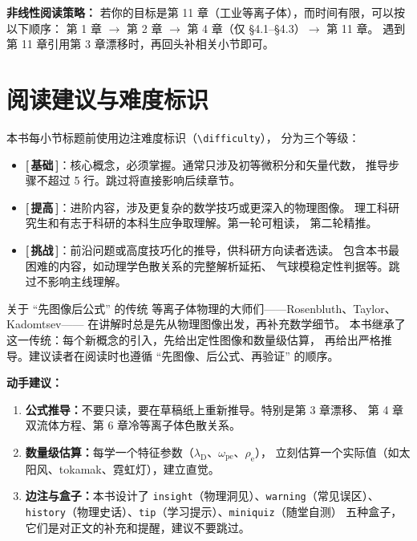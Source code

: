 \documentclass[12pt,a4paper,openany,oneside]{book}
\newcommand{\ee}{\mathrm{e}}
\begin{document}
\begin{tip}
\textbf{非线性阅读策略：}
若你的目标是第 11 章（工业等离子体），而时间有限，可以按以下顺序：
第 1 章 $\to$ 第 2 章 $\to$ 第 4 章（仅 \S 4.1--\S 4.3）$\to$ 第 11 章。
遇到第 11 章引用第 3 章漂移时，再回头补相关小节即可。
\end{tip}


\section*{阅读建议与难度标识}

本书每小节标题前使用边注难度标识（\texttt{\textbackslash difficulty}），
分为三个等级：

\begin{itemize}
\item \textbf{[\,基础\,]}：核心概念，必须掌握。通常只涉及初等微积分和矢量代数，
推导步骤不超过 5 行。跳过将直接影响后续章节。

\item \textbf{[\,提高\,]}：进阶内容，涉及更复杂的数学技巧或更深入的物理图像。
理工科研究生和有志于科研的本科生应争取理解。第一轮可粗读，
第二轮精推。

\item \textbf{[\,挑战\,]}：前沿问题或高度技巧化的推导，供科研方向读者选读。
包含本书最困难的内容，如动理学色散关系的完整解析延拓、
气球模稳定性判据等。跳过不影响主线理解。
\end{itemize}

\begin{history}{关于 ``先图像后公式'' 的传统}{}{}
等离子体物理的大师们——Rosenbluth、Taylor、Kadomtsev——
在讲解时总是先从物理图像出发，再补充数学细节。
本书继承了这一传统：每个新概念的引入，先给出定性图像和数量级估算，
再给出严格推导。建议读者在阅读时也遵循 ``先图像、后公式、再验证'' 的顺序。
\end{history}

\textbf{动手建议：}
\begin{enumerate}
\item \textbf{公式推导：}不要只读，要在草稿纸上重新推导。特别是第 3 章漂移、
第 4 章双流体方程、第 6 章冷等离子体色散关系。
\item \textbf{数量级估算：}每学一个特征参数（$\lambda_\mathrm{D}$、$\omega_{\mathrm{p}\ee}$、$\rho_\ee$），
立刻估算一个实际值（如太阳风、tokamak、霓虹灯），建立直觉。
\item \textbf{边注与盒子：}本书设计了 \texttt{insight}（物理洞见）、\texttt{warning}（常见误区）、
\texttt{history}（物理史话）、\texttt{tip}（学习提示）、\texttt{miniquiz}（随堂自测）
五种盒子，它们是对正文的补充和提醒，建议不要跳过。
\end{enumerate}
\end{document}
